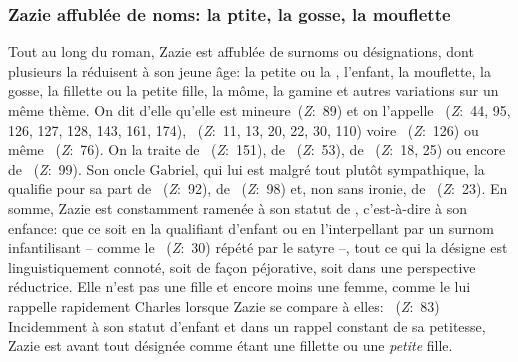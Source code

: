 \subsubsection{Zazie affublée de noms: la ptite, la gosse, la mouflette}
Tout au long du roman, Zazie est affublée de surnoms ou désignations, dont plusieurs la réduisent à son jeune âge: la petite ou la , l'enfant, la mouflette, la gosse, la fillette ou la petite fille, la môme, la gamine et autres variations sur un même thème.
On dit d'elle qu'elle est mineure~(\textit{Z}:~89) et on l'appelle ~(\textit{Z}:~44, 95, 126, 127, 128, 143, 161, 174), ~(\textit{Z}:~11, 13, 20, 22, 30, 110) voire ~(\textit{Z}:~126) ou même ~(\textit{Z}:~76).
On la traite de ~(\textit{Z}:~151), de ~(\textit{Z}:~53), de ~(\textit{Z}:~18, 25) ou encore de ~(\textit{Z}:~99).
Son oncle Gabriel, qui lui est malgré tout plutôt sympathique, la qualifie pour sa part de ~(\textit{Z}:~92), de ~(\textit{Z}:~98) et, non sans ironie, de ~(\textit{Z}:~23).
En somme, Zazie est constamment ramenée à son statut de , c'est-à-dire à son enfance: que ce soit en la qualifiant d'enfant ou en l'interpellant par un surnom infantilisant -- comme le ~(\textit{Z}:~30) répété par le satyre --, tout ce qui la désigne est linguistiquement connoté, soit de façon péjorative, soit dans une perspective réductrice.
Elle n'est pas une fille et encore moins une femme, comme le lui rappelle rapidement Charles lorsque Zazie se compare à elles: ~(\textit{Z}:~83) Incidemment à son statut d'enfant et dans un rappel constant de sa petitesse, Zazie est avant tout désignée comme étant une fillette ou une \textit{petite} fille.

